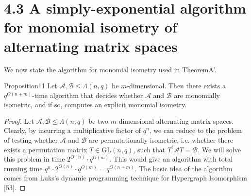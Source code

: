 \section*{4.3 A simply-exponential algorithm for monomial isometry of alternating matrix spaces}
We now state the algorithm for monomial isometry used in TheoremA'.
\begin{authorclaim}{Proposition11}
Let $\mathcal A,\mathcal B\le\Lambda(n,q)$ be $m$-dimensional. Then there exists a $q^{O(n+m)}$-time algorithm that decides whether $\mathcal A$ and $\mathcal B$ are monomially isometric, and if so, computes an explicit monomial isometry.
\end{authorclaim}
\begin{proof}
Let $\mathcal A,\mathcal B\le\Lambda(n,q)$ be two $m$-dimensional alternating matrix spaces. Clearly, by incurring a multiplicative factor of $q^n$, we can reduce to the problem of testing whether $\mathcal A$ and $\mathcal B$ are permutationally isometric, i.e. whether there exists a permutation matrix $T\in\mathrm{GL}(n,q)$, such that $T^t\mathcal A T=\mathcal B$. We will solve this problem in time $2^{O(n)}\cdot q^{O(m)}$. This would give an algorithm with total running time $q^n\cdot2^{O(n)}\cdot q^{O(m)}=q^{O(n+m)}$. The basic idea of the algorithm comes from Luks's dynamic programming technique for Hypergraph Isomorphism [53].

\end{proof}
